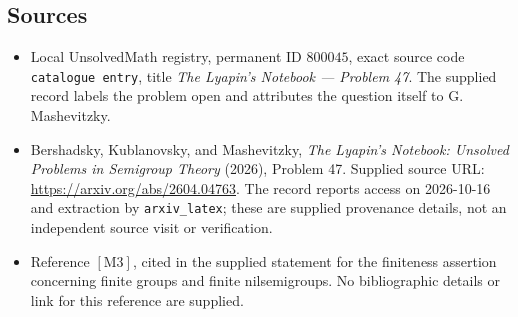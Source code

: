 \documentclass[11pt]{article}
\begin{document}
\subsection{Sources}
\begin{itemize}
\item Local UnsolvedMath registry, permanent ID \(800045\), exact source code \texttt{catalogue entry}, title \emph{The Lyapin's Notebook --- Problem 47}. The supplied record labels the problem open and attributes the question itself to G. Mashevitzky.
\item Bershadsky, Kublanovsky, and Mashevitzky, \emph{The Lyapin's Notebook: Unsolved Problems in Semigroup Theory} (2026), Problem 47. Supplied source URL: \url{https://arxiv.org/abs/2604.04763}. The record reports access on 2026-10-16 and extraction by \texttt{arxiv\_latex}; these are supplied provenance details, not an independent source visit or verification.
\item Reference \([\mathrm{M3}]\), cited in the supplied statement for the finiteness assertion concerning finite groups and finite nilsemigroups. No bibliographic details or link for this reference are supplied.
\end{itemize}
\end{document}
